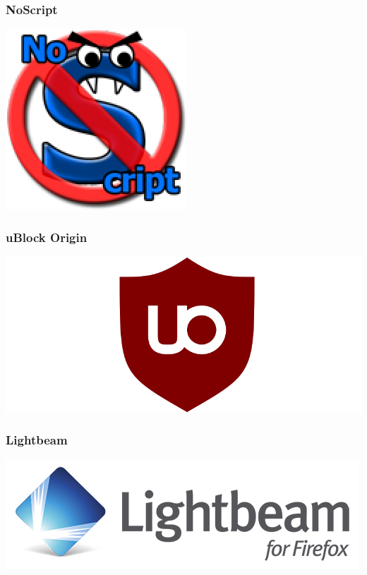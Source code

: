   \begin{frame}
    \frametitle{NoScript}
    \includegraphics[height=0.7\textheight]{../../img/noscript.png}
  \end{frame}

  \begin{frame}
    \frametitle{uBlock Origin}
    \includegraphics[height=0.7\textheight]{../../img/ublock-edge-extension.png}    
  \end{frame}
  
  \begin{frame}
    \frametitle{Lightbeam}
    \includegraphics[height=0.7\textheight]{../../img/lightbeam.png}  
  \end{frame}
